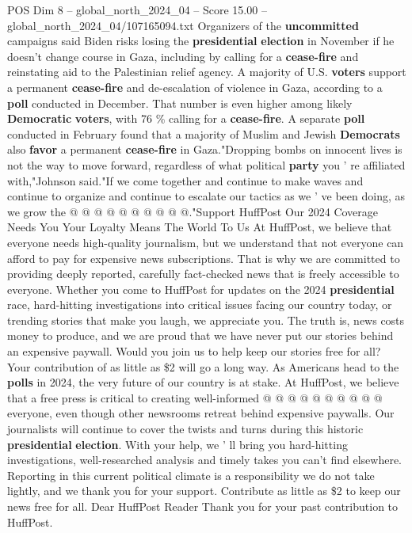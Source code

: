 \begin{textsample}{POS Dim 8 – global\_north\_2024\_04 – Score 15.00 – global\_north\_2024\_04/107165094.txt}
Organizers of the \textbf{uncommitted} campaigns said Biden risks losing the \textbf{presidential} \textbf{election} in November if he doesn't change course in Gaza, including by calling for a \textbf{cease-fire} and reinstating aid to the Palestinian relief agency.
A majority of U.S. \textbf{voters} support a permanent \textbf{cease-fire} and de-escalation of violence in Gaza, according to a \textbf{poll} conducted in December.
That number is even higher among likely \textbf{Democratic} \textbf{voters}, with 76 \% calling for a \textbf{cease-fire}.
A separate \textbf{poll} conducted in February found that a majority of Muslim and Jewish \textbf{Democrats} also \textbf{favor} a permanent \textbf{cease-fire} in Gaza."Dropping bombs on innocent lives is not the way to move forward, regardless of what political \textbf{party} you ' re affiliated with,"Johnson said."If we come together and continue to make waves and continue to organize and continue to escalate our tactics as we ' ve been doing, as we grow the @ @ @ @ @ @ @ @ @ @."Support HuffPost Our 2024 Coverage Needs You Your Loyalty Means The World To Us At HuffPost, we believe that everyone needs high-quality journalism, but we understand that not everyone can afford to pay for expensive news subscriptions.
That is why we are committed to providing deeply reported, carefully fact-checked news that is freely accessible to everyone.
Whether you come to HuffPost for updates on the 2024 \textbf{presidential} race, hard-hitting investigations into critical issues facing our country today, or trending stories that make you laugh, we appreciate you.
The truth is, news costs money to produce, and we are proud that we have never put our stories behind an expensive paywall.
Would you join us to help keep our stories free for all?
Your contribution of as little as \$2 will go a long way.
As Americans head to the \textbf{polls} in 2024, the very future of our country is at stake.
At HuffPost, we believe that a free press is critical to creating well-informed @ @ @ @ @ @ @ @ @ @ everyone, even though other newsrooms retreat behind expensive paywalls.
Our journalists will continue to cover the twists and turns during this historic \textbf{presidential} \textbf{election}.
With your help, we ' ll bring you hard-hitting investigations, well-researched analysis and timely takes you can't find elsewhere.
Reporting in this current political climate is a responsibility we do not take lightly, and we thank you for your support.
Contribute as little as \$2 to keep our news free for all.
Dear HuffPost Reader Thank you for your past contribution to HuffPost.

\end{textsample}
